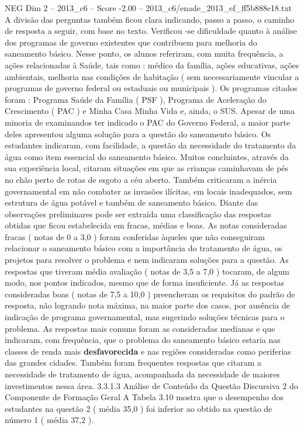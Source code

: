 \begin{textsample}{NEG Dim 2 – 2013\_c6 – Score -2.00 – 2013\_c6/enade\_2013\_ef\_ff5b888e18.txt}
A divisão das perguntas também ficou clara indicando, passo a passo, o caminho de resposta a seguir, com base no texto.
Verificou -se dificuldade quanto à análise dos programas de governo existentes que contribuem para melhoria do saneamento básico.
Nesse ponto, os alunos referiram, com muita frequência, a ações relacionadas à Saúde, tais como : médico da família, ações educativas, ações ambientais, melhoria nas condições de habitação ( sem necessariamente vincular a programas de governo federal ou estaduais ou municipais ).
Os programas citados foram : Programa Saúde da Família ( PSF ), Programa de Aceleração do Crescimento ( PAC ) e Minha Casa Minha Vida e, ainda, o SUS.
Apesar de uma minoria de examinandos ter indicado o PAC do Governo Federal, a maior parte deles apresentou alguma solução para a questão do saneamento básico.
Os estudantes indicaram, com facilidade, a questão da necessidade do tratamento da água como item essencial do saneamento básico.
Muitos concluintes, através da sua experiência local, citaram situações em que as crianças caminhavam de pés no chão perto de rotas de esgoto a céu aberto.
Também criticaram a inércia governamental em não combater as invasões ilícitas, em locais inadequados, sem estrutura de água potável e também de saneamento básico.
Diante das observações preliminares pode ser extraída uma classificação das respostas obtidas que ficou estabelecida em fracas, médias e boas.
As notas consideradas fracas ( notas de 0 a 3,0 ) foram conferidas àqueles que não conseguiram relacionar o saneamento básico com a importância do tratamento de água, os projetos para resolver o problema e nem indicaram soluções para a questão.
As respostas que tiveram média avaliação ( notas de 3,5 a 7,0 ) tocaram, de algum modo, nos pontos indicados, mesmo que de forma insuficiente.
Já as respostas consideradas boas ( notas de 7,5 a 10,0 ) preencheram os requisitos do padrão de resposta, não logrando nota máxima, na maior parte dos casos, por ausência de indicação de programa governamental, mas sugerindo soluções técnicas para o problema.
As respostas mais comuns foram as consideradas medianas e que indicaram, com frequência, que o problema do saneamento básico estaria nas classes de renda mais \textbf{desfavorecida} e nas regiões consideradas como periferias das grandes cidades.
Também foram frequentes respostas que citaram a necessidade de tratamento de água, acompanhada da necessidade de maiores investimentos nessa área. 3.3.1.3 Análise de Conteúdo da Questão Discursiva 2 do Componente de Formação Geral A Tabela 3.10 mostra que o desempenho dos estudantes na questão 2 ( média 35,0 ) foi inferior ao obtido na questão de número 1 ( média 37,2 ).

\end{textsample}
